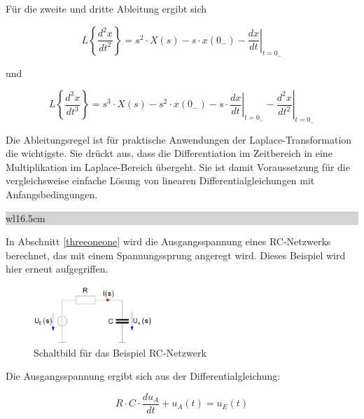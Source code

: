 \noindent F\"{u}r die zweite und dritte Ableitung ergibt sich

\begin{equation}\label{eq:fourseventythree}
L\left\{\frac{d^{2} x}{dt^{2} } \right\}=s^{2} \cdot X\left(s\right)-s\cdot x\left(0_{-} \right)-\left. \frac{dx}{dt} \right|_{t=0_{-} }
\end{equation}

\noindent und

\begin{equation}\label{eq:fourseventyfour}
L\left\{\frac{d^{3} x}{dt^{3} } \right\}=s^{3} \cdot X\left(s\right)-s^{2} \cdot x\left(0_{-} \right)-s\cdot \left. \frac{dx}{dt} \right|_{t=0_{-} } -\left. \frac{d^{2} x}{dt^{2} } \right|_{t=0_{-} } 
\end{equation}

\noindent Die Ableitungsregel ist für praktische Anwendungen der Laplace-Transformation die wichtigste. Sie drückt aus, dass die Differentiation im Zeitbereich in eine Multiplikation im Laplace-Bereich übergeht. Sie ist damit Voraussetzung für die vergleichsweise einfache Lösung von linearen Differentialgleichungen mit Anfangsbedingungen.\bigskip

\noindent
\colorbox{lightgray}{%
%
\renewcommand\arraystretch{0.6}%
\begin{tabular}{ wl{16.5cm} }
{\selectfont{Beispiel: Ableitungsregel der Laplace-Transformation}}
\end{tabular}%
}\bigskip

\noindent In Abschnitt \ref{threeoneone} wird die Ausgangsspannung eines RC-Netzwerks berechnet, das mit einem Spannungssprung angeregt wird. Dieses Beispiel wird hier erneut aufgegriffen.

\begin{figure}[H]
  \centerline{\includegraphics[width=0.4\textwidth]{Kapitel3/Bilder/image7}}
  \caption{Schaltbild für das Beispiel RC-Netzwerk}
  \label{fig:fourRCSchaltbild}
\end{figure}

\noindent Die Ausgangsspannung ergibt sich aus der Differentialgleichung:

\begin{equation}\label{eq:fourseventyfive}
R\cdot C\cdot \frac{du_{A} }{dt} +u_{A} \left(t\right)=u_{E} \left(t\right)
\end{equation}

